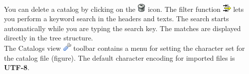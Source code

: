 \documentclass[a4paper,10pt]{book}
\begin{document}
\newline\\
You can delete a catalog by clicking on the \includegraphics[height=2ex]{Icon/Delete.png} icon. The filter function
\includegraphics[height=2ex]{Icon/Filter.png} lets you perform a keyword search in the headers and texts. The search starts
automatically while you are typing the search key. The matches are displayed directly in the tree structure.
\newline\\
The Catalogs view \includegraphics[height=2ex]{Icon/Control_Kataloge.png}
toolbar contains a menu for setting the character set for the catalog file (figure).
The default character encoding for imported files is \textbf{UTF-8}.
\end{document}
